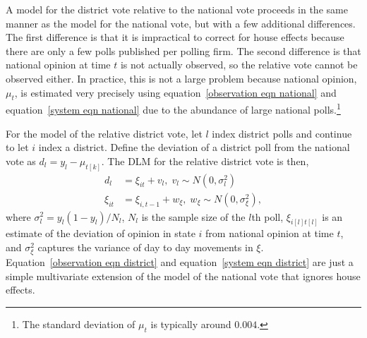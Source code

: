 \documentclass[12pt,final,fleqn]{article}
\theoremstyle{plain}
\begin{document}
A model for the district vote relative to the national vote proceeds in the same manner as the model for the national vote, but with a few additional differences. The first difference is that it is impractical to correct for house effects because there are only a few polls published per polling firm. The second difference is that national opinion at time $t$ is not actually observed, so the relative vote cannot be observed either. In practice, this is not a large problem because national opinion, $\mu_t$, is estimated very precisely using equation~\ref{observation eqn national} and equation~\ref{system eqn national} due to the abundance of large national polls.\footnote{The standard deviation of $\mu_t$ is typically around $0.004$.}

For the model of the relative district vote, let $l$ index district polls and continue to let $i$ index a district. Define the deviation of a district poll from the national vote as $d_l = y_l - \mu_{t[k]}$. The DLM for the relative district vote is then,
\begin{align}
\label{observation eqn district}
d_l &= \xi_{it} + v_l, \; v_l\sim N(0, \sigma^2_l)\\ 
\label{system eqn district}
\xi_{it} &= \xi_{i,t-1} + w_\xi, \; w_\xi \sim N(0, \sigma^2_{\xi}), 
\end{align}
where $\sigma^2_l = y_l(1-y_l)/N_l$, $N_l$ is the sample size of the $l$th poll, $\xi_{i[l]t[l]}$ is an estimate of the deviation of opinion in state $i$ from national opinion at time $t$, and $\sigma^2_{\xi}$ captures the variance of day to day movements in $\xi$. Equation~\ref{observation eqn district} and equation~\ref{system eqn district} are just a simple multivariate extension of the model of the national vote that ignores house effects.
\end{document}

